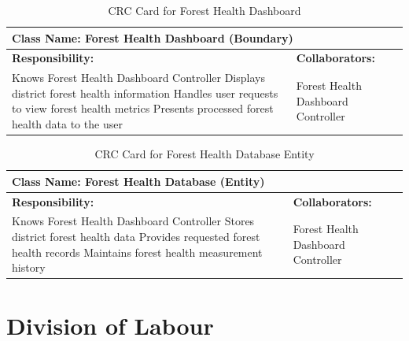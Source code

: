 \documentclass[]{article}
\begin{document}
\begin{table}[H]
    \centering
    \caption{CRC Card for Forest Health Dashboard}
    \vspace{1mm}
    \begin{tabular}{|p{7.5cm}|p{7.5cm}|}
    \hline 
    \multicolumn{2}{|l|}{\textbf{Class Name: Forest Health Dashboard (Boundary)}} \\
    \hline
    \textbf{Responsibility:} & \textbf{Collaborators:} \\
    \hline
        Knows Forest Health Dashboard Controller \newline
        Displays district forest health information \newline
        Handles user requests to view forest health metrics \newline
        Presents processed forest health data to the user \newline
        &
        Forest Health Dashboard Controller \\
    \hline
    \end{tabular}
    \end{table}
\begin{table}[H]
    \centering
    \caption{CRC Card for Forest Health Database Entity}
    \vspace{1mm}
    \begin{tabular}{|p{7.5cm}|p{7.5cm}|}
    \hline 
    \multicolumn{2}{|l|}{\textbf{Class Name: Forest Health Database (Entity)}} \\
    \hline
    \textbf{Responsibility:} & \textbf{Collaborators:} \\
    \hline
        Knows Forest Health Dashboard Controller \newline
        Stores district forest health data \newline
        Provides requested forest health records \newline
        Maintains forest health measurement history \newline
        &
        Forest Health Dashboard Controller \\
    \hline
    \end{tabular}
\end{table}

\newpage
\appendix
\section{Division of Labour}
\label{sec:division_of_labour}
\end{document}
